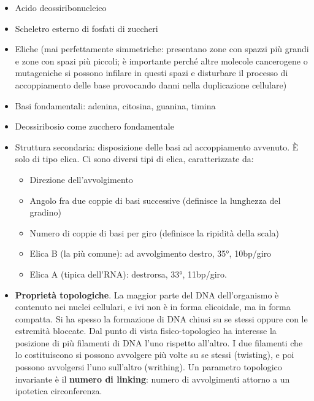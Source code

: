 \begin{itemize}
\item
  Acido deossiribonucleico
\item
  Scheletro esterno di fosfati di zuccheri
\item
  Eliche (mai perfettamente simmetriche: presentano zone con spazzi più
  grandi e zone con spazi più piccoli; è importante perché altre
  molecole cancerogene o mutageniche si possono infilare in questi spazi
  e disturbare il processo di accoppiamento delle base provocando danni
  nella duplicazione cellulare)
\item
  Basi fondamentali: adenina, citosina, guanina, timina
\item
  Deossiribosio come zucchero fondamentale
\item
  Struttura secondaria: disposizione delle basi ad accoppiamento
  avvenuto. È solo di tipo elica. Ci sono diversi tipi di elica,
  caratterizzate da:

  \begin{itemize}
  \item
    Direzione dell'avvolgimento
  \item
    Angolo fra due coppie di basi successive (definisce la lunghezza del
    gradino)
  \item
    Numero di coppie di basi per giro (definisce la ripidità della
    scala)
  \end{itemize}

  \begin{itemize}
  \item
    Elica B (la più comune): ad avvolgimento destro, 35°, 10bp/giro
  \item
    Elica A (tipica dell'RNA): destrorsa, 33°, 11bp/giro.
  \end{itemize}
\item
  \textbf{Proprietà topologiche}. La maggior parte del DNA
  dell'organismo è contenuto nei nuclei cellulari, e ivi non è in forma
  elicoidale, ma in forma compatta. Si ha spesso la formazione di DNA
  chiusi su se stessi oppure con le estremità bloccate. Dal punto di
  vista fisico-topologico ha interesse la posizione di più filamenti di
  DNA l'uno rispetto all'altro. I due filamenti che lo costituiscono si
  possono avvolgere più volte su se stessi (twisting), e poi possono
  avvolgersi l'uno sull'altro (writhing). Un parametro topologico
  invariante è il \textbf{numero di linking}: numero di avvolgimenti
  attorno a un ipotetica circonferenza.
\end{itemize}

